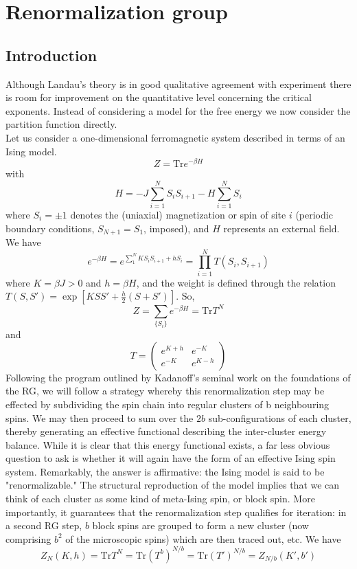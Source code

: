 \section{Renormalization group}
\subsection{Introduction}
Although Landau's theory is in good qualitative agreement with experiment there is room for improvement on the quantitative level concerning the critical exponents.
Instead of considering a model for the free energy we now consider the partition function directly. 
\\
Let us consider a one-dimensional ferromagnetic system described in terms of an Ising model.
\[Z = \mathrm{Tr}e^{-\beta H}\]
with
\[H = -J\sum_{i=1}^N S_i S_{i+1} - H\sum_{i=1}^N S_i\]
where $S_i = \pm 1$ denotes the (uniaxial) magnetization or spin of site $i$ (periodic boundary conditions, $S_{N+1} = S_1$, imposed), and $H$ represents an external field. We have
\[e^{-\beta H} = e^{\sum_{1}^N KS_iS_{i+1} + hS_i} = \prod_{i=1}^N T(S_i,S_{i+1})\]
where $K = \beta J > 0$ and $h = \beta H$, and the weight is defined through the relation $T(S,S') = \exp[KSS' + \frac{h}{2}(S+S')]$. So,
\[Z = \sum_{\{S_i\}} e^{-\beta H} = \mathrm{Tr}T^N\]
and
\[T = \begin{pmatrix}
e^{K+h} & e^{-K} \\ e^{-K} & e^{K-h}
\end{pmatrix}\]
Following the program outlined by Kadanoff's seminal work on the foundations of the RG, we will follow a strategy whereby this renormalization step may be effected by subdividing the spin chain into regular clusters of b neighbouring spins. We may then proceed to sum over the $2b$ sub-configurations of each cluster, thereby generating an effective functional describing the inter-cluster energy balance. 
While it is clear that this energy functional exists, a far less obvious question to ask is whether it will again have the form of an effective Ising spin system. Remarkably, the answer is affirmative: the Ising model is said to be "renormalizable." 
The structural reproduction of the model implies that we can think of each cluster as some kind of meta-Ising spin, or block spin. More importantly, it guarantees that the renormalization step qualifies for iteration: in a second RG step, $b$ block spins are grouped to form a new cluster (now comprising $b^2$ of the microscopic spins) which are then traced out, etc. We have
\[Z_{N}(K,h) = \mathrm{Tr} T^N = \mathrm{Tr} (T^b)^{N/b} =\mathrm{Tr} (T')^{N/b} = Z_{N/b}(K',b')\]
